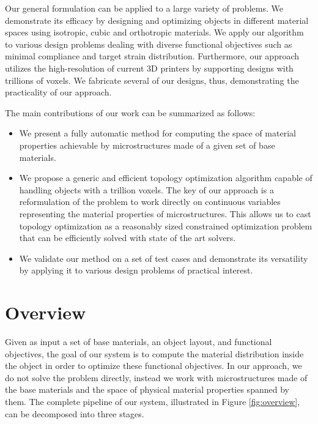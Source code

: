 Our general formulation can be applied to a large variety of problems. We demonstrate its efficacy by designing and optimizing objects in different material spaces using isotropic, cubic and orthotropic materials. We apply our algorithm to various design problems dealing with diverse functional objectives such as minimal compliance and target strain distribution. Furthermore, our approach utilizes the high-resolution of current 3D printers by supporting designs with trillions of voxels. We fabricate several of our designs, thus, demonstrating the practicality of our approach.

The main contributions of our work can be summarized as follows:
\begin{itemize}
	\item We present a fully automatic method for computing the space of material properties achievable by microstructures made of a given set of base materials.
	\item We propose a generic and efficient topology optimization algorithm capable of handling objects with a trillion voxels. The key of our approach is a reformulation of the problem to work directly on continuous variables representing the material properties of microstructures. This allows us to cast topology optimization as a reasonably sized constrained optimization problem that can be efficiently solved with state of the art solvers.
	\item We validate our method on a set of test cases and demonstrate its versatility by applying it to various design problems of practical interest.
\end{itemize}
\section{Overview}
Given as input a set of base materials, an object layout, and functional objectives, the goal of our system is to compute the material distribution inside the object in order to optimize these functional objectives. In our approach, we do not solve the problem directly, instead we work with microstructures made of the base materials and the space of physical material properties spanned by them. The complete pipeline of our system, illustrated in Figure \ref{fig:overview}, can be decomposed into three stages.


